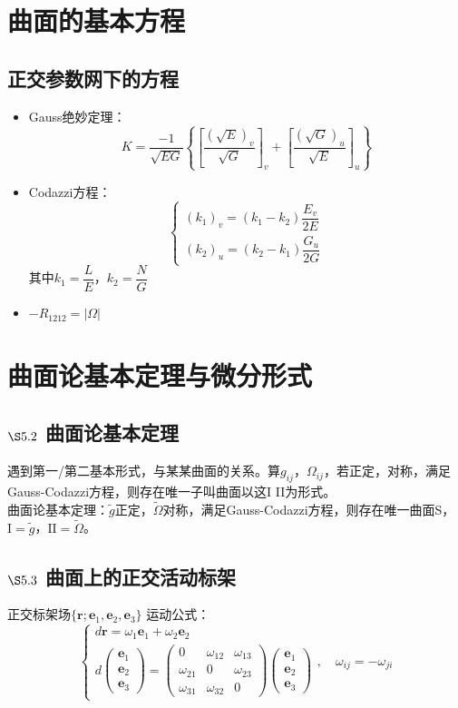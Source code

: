 \documentclass{article}
\begin{document}
	\section{曲面的基本方程}
	\subsection{正交参数网下的方程}
	\begin{itemize}
		\item Gauss绝妙定理：
		\[
		K=\dfrac{-1}{\sqrt{EG}}\left\{\left[\dfrac{(\sqrt{E})_v}{\sqrt{G}}\right]_v+\left[\dfrac{(\sqrt{G})_u}{\sqrt{E}}\right]_u\right\}
		\]
		\item Codazzi方程：
		\[
		\begin{cases}
			(k_1)_v=(k_1-k_2)\dfrac{E_v}{2E}\\
			(k_2)_u=(k_2-k_1)\dfrac{G_u}{2G}
		\end{cases}
		\]
		其中$k_1=\dfrac{L}{E}$，$k_2=\dfrac{N}{G}$
		\item $-R_{1212}=|\Omega|$
	\end{itemize}
	
	\section{曲面论基本定理与微分形式}
	\subsection{$\S5.2$ 曲面论基本定理}
	遇到第一/第二基本形式，与某某曲面的关系。算$g_{ij}$，$\Omega_{ij}$，若正定，对称，满足Gauss-Codazzi方程，则存在唯一子叫曲面以这I II为形式。\\
	曲面论基本定理：$\tilde{g}$正定，$\tilde{\Omega}$对称，满足Gauss-Codazzi方程，则存在唯一曲面S，$\mathrm{I}=\tilde{g}$，$\mathrm{II}=\tilde{\Omega}$。
	
	\subsection{$\S5.3$ 曲面上的正交活动标架}
	正交标架场$\{\boldsymbol{r};\boldsymbol{e}_1,\boldsymbol{e}_2,\boldsymbol{e}_3\}$
	运动公式：
	\[
	\begin{cases}
		d\boldsymbol{r}=\omega_1\boldsymbol{e}_1+\omega_2\boldsymbol{e}_2\\
		d\begin{pmatrix}\boldsymbol{e}_1\\\boldsymbol{e}_2\\\boldsymbol{e}_3\end{pmatrix}=\begin{pmatrix}0&\omega_{12}&\omega_{13}\\\omega_{21}&0&\omega_{23}\\\omega_{31}&\omega_{32}&0\end{pmatrix}\begin{pmatrix}\boldsymbol{e}_1\\\boldsymbol{e}_2\\\boldsymbol{e}_3\end{pmatrix}
	\end{cases},\quad\omega_{ij}=-\omega_{ji}
	\]
	
\end{document}
